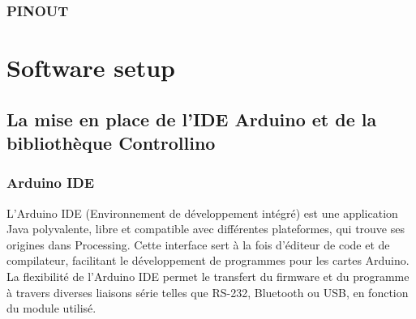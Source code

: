 \documentclass[a4paper,12pt]{report}
\begin{document}
\subsection{PINOUT}
\begin{center}
\label{}
\end{center}
\newpage
\chapter{\textbf{Software setup}}
\section{La mise en place de l'IDE Arduino et de la bibliothèque Controllino}
\subsection{Arduino IDE}
L'Arduino IDE (Environnement de développement intégré) est une application Java polyvalente, libre et compatible avec différentes plateformes, qui trouve ses origines dans Processing. Cette interface sert à la fois d'éditeur de code et de compilateur, facilitant le développement de programmes pour les cartes Arduino. La flexibilité de l'Arduino IDE permet le transfert du firmware et du programme à travers diverses liaisons série telles que RS-232, Bluetooth ou USB, en fonction du module utilisé.\\
\end{document}
